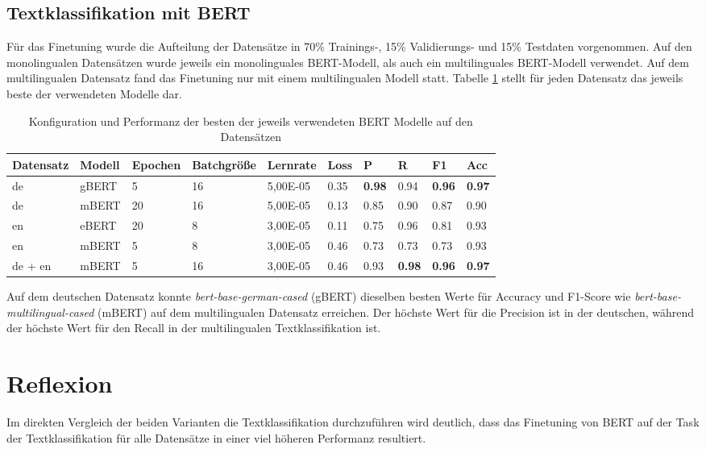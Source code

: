 \documentclass[ngerman]{ttlab-qualify}
\begin{document}
\subsection{Textklassifikation mit BERT}
Für das Finetuning wurde die Aufteilung der Datensätze in 70\% Trainings-, 15\% Validierungs- und 15\% Testdaten vorgenommen. Auf den monolingualen Datensätzen wurde jeweils ein monolinguales BERT-Modell, als auch ein multilinguales BERT-Modell verwendet. Auf dem multilingualen Datensatz fand das Finetuning nur mit einem multilingualen Modell statt. Tabelle \ref{best_BERT} stellt für jeden Datensatz das jeweils beste der verwendeten Modelle dar.
\begin{table}[H]
    \centering
    \caption{Konfiguration und Performanz der besten der jeweils verwendeten BERT Modelle auf den Datensätzen} \label{best_BERT}
    \begin{tabular}{|l|l|l|l|l|l|l|l|l|l|}
    \hline
        \textbf{Datensatz} & \textbf{Modell} & \textbf{Epochen} & \textbf{Batchgröße} & \textbf{Lernrate} & \textbf{Loss} & \textbf{P} & \textbf{R} & \textbf{F1} & \textbf{Acc} \\ \hline
        de & gBERT & 5 & 16 & 5,00E-05 & 0.35 & \textbf{0.98} & 0.94 & \textbf{0.96} & \textbf{0.97} \\ \hline
        de & mBERT & 20 & 16 & 5,00E-05 & 0.13 & 0.85 & 0.90 & 0.87 & 0.90 \\ \hline
        en & eBERT & 20 & 8 & 3,00E-05 & 0.11 & 0.75 & 0.96 & 0.81 & 0.93 \\ \hline
        en & mBERT & 5 & 8 & 3,00E-05 & 0.46 & 0.73 & 0.73 & 0.73 & 0.93 \\ \hline
        de + en & mBERT & 5 & 16 & 3,00E-05 & 0.46 & 0.93 & \textbf{0.98} & \textbf{0.96} & \textbf{0.97} \\ \hline
    \end{tabular}
\end{table}
\noindent Auf dem deutschen Datensatz konnte \textit{bert-base-german-cased} (gBERT) dieselben besten Werte für Accuracy und F1-Score wie \textit{bert-base-multilingual-cased} (mBERT) auf dem multilingualen Datensatz erreichen. Der höchste Wert für die Precision ist in der deutschen, während der höchste Wert für den Recall in der multilingualen Textklassifikation ist.
\section{Reflexion}
Im direkten Vergleich der beiden Varianten die Textklassifikation durchzuführen wird deutlich, dass das Finetuning von BERT auf der Task der Textklassifikation für alle Datensätze in einer viel höheren Performanz resultiert.
\end{document}
